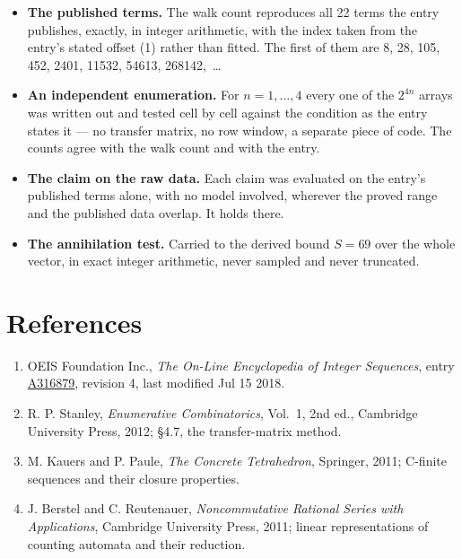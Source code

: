 \documentclass[11pt]{article}
\theoremstyle{definition}
\begin{document}
\begin{itemize}

\item {\bfseries The published terms.} The walk count reproduces all 22 terms the entry publishes, exactly, in integer arithmetic, with the index taken from the entry's stated offset (1) rather than fitted. The first of them are 8, 28, 105, 452, 2401, 11532, 54613, 268142,~\dots

\item {\bfseries An independent enumeration.} For $n = 1,\dots,4$ every one of the $2^{4n}$ arrays was written out and tested cell by cell against the condition as the entry states it --- no transfer matrix, no row window, a separate piece of code. The counts agree with the walk count and with the entry.

\item {\bfseries The claim on the raw data.} Each claim was evaluated on the entry's published terms alone, with no model involved, wherever the proved range and the published data overlap. It holds there.

\item {\bfseries The annihilation test.} Carried to the derived bound $S = 69$ over the whole vector, in exact integer arithmetic, never sampled and never truncated.

\end{itemize}

\section{References}

\begin{enumerate}

\item OEIS Foundation Inc., \emph{The On-Line Encyclopedia of Integer Sequences}, entry \href{https://oeis.org/A316879}{A316879}, revision 4, last modified Jul 15 2018.

\item R. P. Stanley, \emph{Enumerative Combinatorics}, Vol.~1, 2nd ed., Cambridge University Press, 2012; \S4.7, the transfer-matrix method.

\item M. Kauers and P. Paule, \emph{The Concrete Tetrahedron}, Springer, 2011; C-finite sequences and their closure properties.

\item J. Berstel and C. Reutenauer, \emph{Noncommutative Rational Series with Applications}, Cambridge University Press, 2011; linear representations of counting automata and their reduction.

\end{enumerate}
\end{document}
